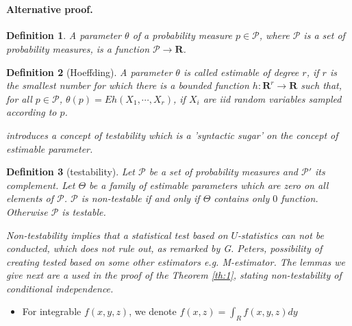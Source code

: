\documentclass{article}
\title{}
\author{KC}
\date{}
\newtheorem{definition}{Definition}
\begin{document}
\maketitle

\section{}


\paragraph{Alternative proof.}


\begin{definition}
 A parameter  $\theta$ of a probability measure $p \in \mathcal P$, where $\mathcal P$ is a set of probability measures, is a function $\mathcal P  \to  \mathbf R$.   
\end{definition}


\begin{definition}[Hoeffding]
A parameter  $\theta$ is called estimable of degree $r$, if $r$ is the smallest number for which there is a bounded function $h : \mathbf R^{r} \to \mathbf R$ such that, for all $p \in \mathcal P$, $ \theta(p) = Eh(X_1, \cdots , X_r)$,  if $X_i$ are iid random variables sampled according to $p$.
\end{definition}

\textit{ \color{ForestGreen} 
\cite{bergsma2004testing} introduces a concept of testability which is a 'syntactic sugar' on the concept of estimable parameter.
}

\begin{definition}[testability]
 Let $\mathcal{P}$ be a set of probability measures and $\mathcal{P}'$ its complement. Let $\Theta$ be a family of  estimable parameters which are zero on all elements of $\mathcal{P}$.  $\mathcal{P}$ is non-testable if and only if $\Theta$ contains only $0$ function. Otherwise $\mathcal{P}$ is testable. 
\end{definition}


\textit{ \color{ForestGreen} 
Non-testability implies that a statistical test based on $U$-statistics can not be conducted, which does not rule out, as remarked by G. Peters, possibility of creating tested based on some other estimators e.g. M-estimator. The lemmas we give next are a used in the proof of the Theorem  \ref{th:1}, stating non-testability of conditional independence. 
}

\begin{itemize}
 \item For integrable $f(x,y,z)$, we denote  $f(x,z) = \int_{R} f(x,y,z) dy$
\end{itemize}
\end{document}

